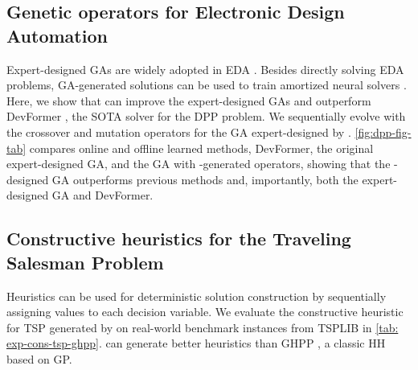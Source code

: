 \subsection{Genetic operators for Electronic Design Automation}

Expert-designed GAs are widely adopted in EDA \cite{shibasaka2013decoupling, zebulum2018evolutionary_electronics, de2020genetic, jiang2024novel}. Besides directly solving EDA problems, GA-generated solutions can be used to train amortized neural solvers \cite{kim2023devformer}. Here, we show that \our{} can improve the expert-designed GAs and outperform DevFormer \citep{kim2023devformer}, the SOTA solver for the DPP problem. We sequentially evolve with \our{} the crossover and mutation operators for the GA expert-designed by \citet{park2023versatile}. \cref{fig:dpp-fig-tab} compares online and offline learned methods, DevFormer, the original expert-designed GA, and the GA with \our{}-generated operators, showing that the \our{}-designed GA outperforms previous methods and, importantly, both the expert-designed GA and DevFormer.




\subsection{Constructive heuristics for the Traveling Salesman Problem}

Heuristics can be used for deterministic solution construction by sequentially assigning values to each decision variable. We evaluate the constructive heuristic for TSP generated by \our{} on real-world benchmark instances from TSPLIB \citep{reinelt1991tsplib} in \cref{tab: exp-cons-tsp-ghpp}. \our{} can generate better heuristics than GHPP \cite{duflo2019gp_hh_tsp}, a classic HH based on GP.


